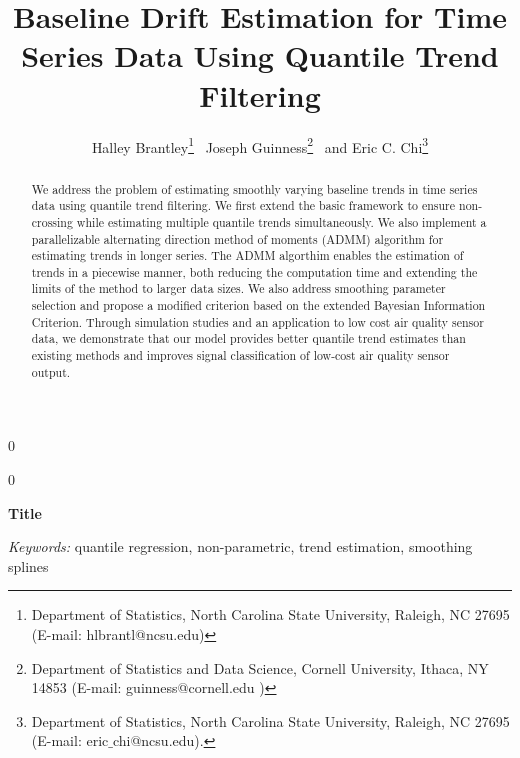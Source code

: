 \documentclass[12pt]{article}
\newcommand{\blind}{0}
\begin{document}
	
	
	\def\spacingset#1{\renewcommand{\baselinestretch}%
		{#1}\small\normalsize} \spacingset{1}
	
	
	
	\blind
	{
		\title{\bf Baseline Drift Estimation for Time Series Data Using Quantile Trend Filtering}
		\author{Halley Brantley\thanks{
				Department of Statistics, North Carolina State University, Raleigh, NC 27695 (E-mail: hlbrantl@ncsu.edu)} \,
			Joseph Guinness\thanks{
				Department of Statistics and Data Science, Cornell University, Ithaca, NY 14853 (E-mail: guinness@cornell.edu )} \,
			and
			Eric C. Chi\thanks{Department of Statistics, North Carolina State University, Raleigh, NC 27695 (E-mail: eric$\_$chi@ncsu.edu).}    \\}
		\date{}
		\maketitle
	} \fi
		
	\blind
	{
		\bigskip
		\bigskip
		\bigskip
		\begin{center}
			{\LARGE\bf Title}
		\end{center}
		\medskip
	} \fi
	
	\bigskip
	\begin{abstract}
		We address the problem of estimating smoothly varying baseline trends in time series data using quantile trend filtering. We first extend the basic framework to ensure non-crossing while estimating multiple quantile trends simultaneously. We also implement a parallelizable alternating direction method of moments (ADMM) algorithm for estimating trends in longer series. The ADMM algorthim enables the estimation of trends in a piecewise manner, both reducing the computation time and extending the limits of the method to larger data sizes. We also address smoothing parameter selection and propose a modified criterion based on the extended Bayesian Information Criterion. Through simulation studies and an application to low cost air quality sensor data, we demonstrate that our model provides better quantile trend estimates than existing methods and improves signal classification of low-cost air quality sensor output. 
	\end{abstract}
	
	\noindent%
	{\it Keywords:} quantile regression, non-parametric, trend estimation, smoothing splines
	\vfill
	
\end{document}
